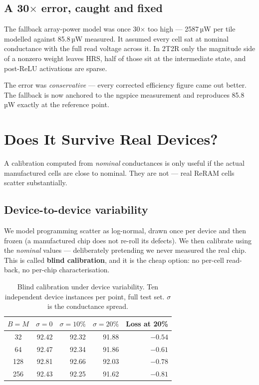 \documentclass[11pt,a4paper]{report}
\newcommand{\jargon}[1]{\textcolor{acc}{\textbf{#1}}}
\begin{document}
\section{A 30$\times$ error, caught and fixed}

The fallback array-power model was once 30$\times$ too high --- 2587\,µW per
tile modelled against 85.8\,µW measured. It assumed every cell sat at nominal
conductance with the full read voltage across it. In 2T2R only the magnitude
side of a nonzero weight leaves HRS, half of those sit at the intermediate
state, and post-ReLU activations are sparse.

The error was \emph{conservative} --- every corrected efficiency figure came
out better. The fallback is now anchored to the ngspice measurement and
reproduces 85.8\,µW exactly at the reference point.

\chapter{Does It Survive Real Devices?}

A calibration computed from \emph{nominal} conductances is only useful if the
actual manufactured cells are close to nominal. They are not --- real ReRAM
cells scatter substantially.

\section{Device-to-device variability}

We model programming scatter as log-normal, drawn once per device and then
frozen (a manufactured chip does not re-roll its defects). We then calibrate
using the \emph{nominal} values --- deliberately pretending we never measured
the real chip. This is called \jargon{blind calibration}, and it is the cheap
option: no per-cell read-back, no per-chip characterisation.

\begin{table}[h]
\centering
\caption{Blind calibration under device variability. Ten independent device
instances per point, full test set. $\sigma$ is the conductance spread.}
\begin{tabular}{crrrr}
\toprule
$B = M$ & $\sigma = 0$ & $\sigma = 10\%$ & $\sigma = 20\%$ & Loss at 20\% \\
\midrule
32  & 92.42 & 92.32 & 91.88 & $-0.54$ \\
64  & 92.47 & 92.34 & 91.86 & $-0.61$ \\
128 & 92.81 & 92.66 & 92.03 & $-0.78$ \\
256 & 92.43 & 92.25 & 91.62 & $-0.81$ \\
\bottomrule
\end{tabular}
\end{table}
\end{document}
